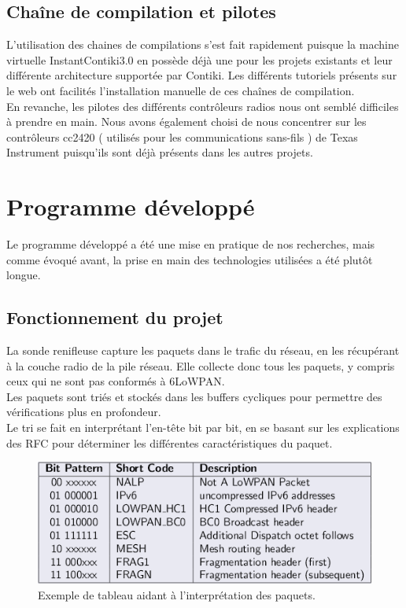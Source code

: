 	\subsection{Chaîne de compilation et pilotes}
	L'utilisation des chaines de compilations s'est fait rapidement puisque la machine virtuelle InstantContiki3.0 en possède déjà une pour les projets existants et leur différente architecture supportée par Contiki. Les différents tutoriels présents sur le web ont facilités l'installation manuelle de ces chaînes de compilation.\\
	En revanche, les pilotes des différents contrôleurs radios nous ont semblé difficiles à prendre en main. Nous avons également choisi de nous concentrer sur les contrôleurs cc2420 ( utilisés pour les communications sans-fils ) de Texas Instrument puisqu'ils sont déjà présents dans les autres projets.

\section{Programme développé}
	Le programme développé a été une mise en pratique de nos recherches, mais comme évoqué avant, la prise en main des technologies utilisées a été plutôt longue.
	\subsection{Fonctionnement du projet}
		La sonde renifleuse capture les paquets dans le trafic du réseau, en les récupérant à la couche radio de la pile réseau. Elle collecte donc tous les paquets, y compris ceux qui ne sont pas conformés à 6LoWPAN.\\
		Les paquets sont triés et stockés dans les buffers cycliques pour permettre des vérifications plus en profondeur.\\
		Le tri se fait en interprétant l'en-tête bit par bit, en se basant sur les explications des RFC pour déterminer les différentes caractéristiques du paquet.
		\begin{figure}[htp]
			\centering
			\includegraphics[width=15cm]{images/parsing}
			\caption{Exemple de tableau aidant à l'interprétation des paquets.}
			\label{fig:parsing}
		\end{figure}
